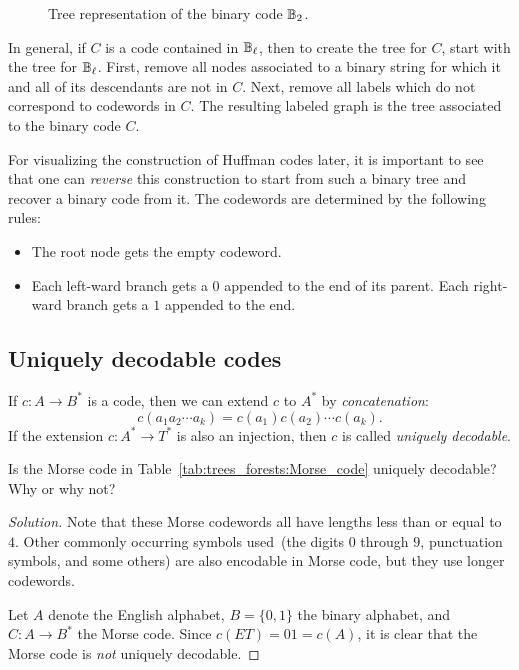 \begin{figure}[!htbp]
\centering

\caption{Tree representation of the binary code $\mathbb{B}_2$.}
\label{fig:trees_forests:tree_representation_B_2}
\end{figure}

In general, if $C$ is a code contained in $\mathbb{B}_\ell$, then to create
the tree for $C$, start with the tree for $\mathbb{B}_\ell$. First, remove
all nodes associated to a binary string for which it and all of its
descendants are not in $C$. Next, remove all labels which do not
correspond to codewords in $C$. The resulting labeled graph is the
tree associated to the binary code $C$.

For visualizing the construction of Huffman codes later, it is
important to see that one can \emph{reverse} this construction to
start from such a binary tree and recover a binary code from it. The
codewords are determined by the following rules:
%
\begin{itemize}
\item The root node gets the empty codeword.

\item Each left-ward branch gets a $0$ appended to the end of its
  parent. Each right-ward branch gets a $1$ appended to the end.
\end{itemize}



\subsection{Uniquely decodable codes}

If $c: A \to B^*$ is a code, then we can extend $c$ to
$A^*$ by \emph{concatenation}:
\[
c(a_1 a_2 \cdots a_k)
=
c(a_1) c(a_2) \cdots c(a_k).
\]
If the extension $c: A^* \to T^*$ is also an injection,
then $c$ is called \emph{uniquely decodable}.

\begin{example}
Is the Morse code in
Table~\ref{tab:trees_forests:Morse_code} uniquely decodable? Why or
why not?
\end{example}

\begin{proof}[Solution]
Note that these Morse codewords all have lengths less than or equal to
$4$. Other commonly occurring symbols used~(the digits $0$ through
$9$, punctuation symbols, and some others) are also encodable in Morse
code, but they use longer codewords.

Let $A$ denote the English alphabet, $B = \{0, 1\}$ the binary
alphabet, and $C: A \to B^*$ the Morse code. Since
$c(ET) = 01 = c(A)$, it is clear that the Morse code is \emph{not}
uniquely decodable.
\end{proof}

